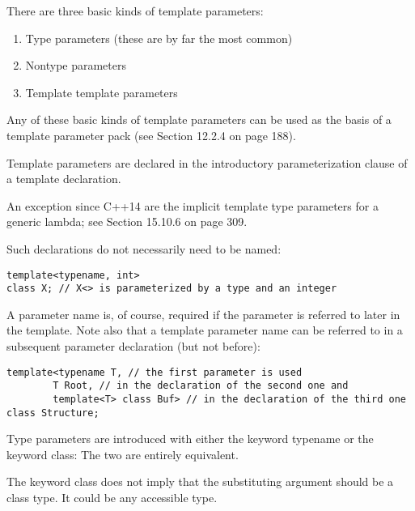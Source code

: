 
There are three basic kinds of template parameters:

\begin{enumerate}
\item 
Type parameters (these are by far the most common)

\item 
Nontype parameters

\item 
Template template parameters
\end{enumerate}	

Any of these basic kinds of template parameters can be used as the basis of a template parameter pack (see Section 12.2.4 on page 188).

Template parameters are declared in the introductory parameterization clause of a template declaration.

\begin{tcolorbox}[colback=webgreen!5!white,colframe=webgreen!75!black]
\hspace*{0.75cm}An exception since C++14 are the implicit template type parameters for a generic lambda; see Section 15.10.6 on page 309.
\end{tcolorbox}

Such declarations do not necessarily need to be named:

\begin{lstlisting}[style=styleCXX]
template<typename, int>
class X; // X<> is parameterized by a type and an integer
\end{lstlisting}

A parameter name is, of course, required if the parameter is referred to later in the template. Note also that a template parameter name can be referred to in a subsequent parameter declaration (but not before):

\begin{lstlisting}[style=styleCXX]
template<typename T, // the first parameter is used
		T Root, // in the declaration of the second one and
		template<T> class Buf> // in the declaration of the third one
class Structure;
\end{lstlisting}


Type parameters are introduced with either the keyword typename or the keyword class: The two are entirely equivalent.

\begin{tcolorbox}[colback=webgreen!5!white,colframe=webgreen!75!black]
\hspace*{0.75cm}The keyword class does not imply that the substituting argument should be a class type. It could be any accessible type.
\end{tcolorbox}

